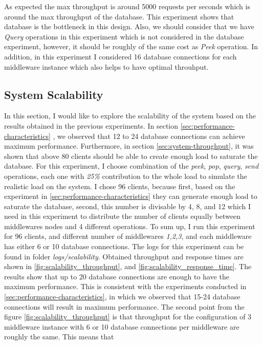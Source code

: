 \documentclass[11pt]{article}
\begin{document}
As expected the max throughput is around 5000 requests per seconds which is around the max throughput of the 
database. This experiment shows that database is the bottleneck in this design. 
Also, we should consider that we have \emph{Query} operations in this experiment
which is not considered in the database experiment, however, it should be 
roughly of the same cost as \emph{Peek} operation. In addition, in this experiment
I considered 16 database connections for each middleware instance which also 
helps to have optimal throuhput.


\subsection{System Scalability}\label{sec:system-scalability}
In this section, I would like to explore the scalability of the system based on the 
results obtained in the previous experiments. In section \ref{sec:performance-characteristics}
, we observed that 12 to 24 database connections can achieve maximum performance.
Furthermore, in section \ref{sec:system-throughput}, it was shown that above 80
clients should be able to create enough load to saturate the database.
For this experiment, I choose combination of the \emph{peek}, \emph{pop},
\emph{query}, \emph{send} operations, each one with \emph{25\%} contribution to the 
whole load to simulate the realistic load on the system. I chose 96 clients, because first, based on the
experiment in \ref{sec:performance-characteristics} they can generate enough load to 
saturate the database, second, this number is divisable by 4, 8, and 12 which
I need in this experiment to distribute the number of clients equally 
between middlewares nodes and 4 different operations.
To sum up, I run this experiment for 96 clients, and different number of middlewares 
\emph{1,2,3}, and each middleware has either 6 or 10 database connections. 
The logs for this experiment can be found in folder \emph{logs/scalability}.
Obtained throughput and response times are shown in \ref{fig:scalability_throughput}, and 
\ref{fig:scalability_response_time}. The results show that 
up to 20 database connections are enough to have the 
maximum performance. This is consistent with the experiments 
conducted in \ref{sec:performance-characteristics}, in which 
we observed that 15-24 database connections will result in maximum 
performance. The second point from the figure \ref{fig:scalability_throughput}
is that throughput for the configuration of 3 middleware instance with 
6 or 10 database connections per middleware are roughly the same. This means that 
\end{document}
